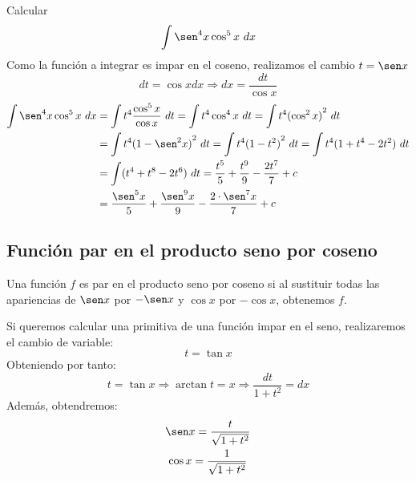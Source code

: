 \begin{ejemplo}
    Calcular
    \begin{equation*}
        \displaystyle\int \sen^4x\cos^5x~dx 
    \end{equation*}
    Como la función a integrar es impar en el coseno, realizamos el cambio $t = \sen x$
    \begin{equation*}
        dt = \cos x dx \Longrightarrow dx = \dfrac{dt}{\cos x}
    \end{equation*}
    \begin{align*}
        \displaystyle\int \sen^4x\cos^5x~dx &= \displaystyle\int t^4 \dfrac{\cos^5x}{\cos x}~dt  = \displaystyle\int t^4 \cos^4 x~dt = \displaystyle\int t^4 {(\cos^2 x)}^{2}~dt \\
                                            &= \displaystyle\int t^4 {(1-\sen^2x)}^{2}~dt = \displaystyle\int t^4 {(1-t^2)}^{2}~dt  = \displaystyle\int t^4(1+t^4-2t^2)~dt \\
                                            &= \displaystyle\int (t^4 + t^8 -2t^6)~dt = \dfrac{t^5}{5}+\dfrac{t^9}{9}-\dfrac{2t^7}{7} +c\\
                                            &= \dfrac{\sen^5x}{5}+\dfrac{\sen^9x}{9}-\dfrac{2\cdot \sen^7x}{7}+c
    \end{align*}
\end{ejemplo}

\subsection{Función par en el producto seno por coseno}
\begin{definicion}
    Una función $f$ es par en el producto seno por coseno si al sustituir todas las apariencias de $\sen x$ por $-\sen x$ y $\cos x$ por $-\cos x$, obtenemos $f$.
\end{definicion}
Si queremos calcular una primitiva de una función impar en el seno, realizaremos el cambio de variable:
\begin{equation*}
    t = \tan x
\end{equation*}
Obteniendo por tanto:
\begin{equation*}
    t = \tan x \Longrightarrow \arctan t = x \Longrightarrow \dfrac{dt}{1+t^2} = dx
\end{equation*}
Además, obtendremos:
\begin{gather*}
    \sen x = \dfrac{t}{\sqrt{1+t^2}} \\
    \cos x = \dfrac{1}{\sqrt{1+t^2}}
\end{gather*}

